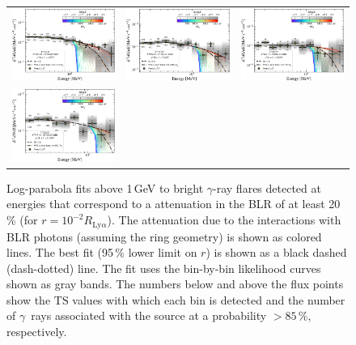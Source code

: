 \documentclass[twocolumn,linenumbers]{aastex62}
\newcommand{\Grays}{$\gamma$~rays\xspace}
\newcommand{\gray}{$\gamma$-ray\xspace}
\begin{document}
\begin{figure}
\begin{tabular}{ccc}
    \includegraphics[width=0.32\linewidth]{figures/sed_CTA102_t002_LogParabola_3min_ring_emin1000.pdf} & 
    \includegraphics[width=0.32\linewidth]{figures/sed_CTA102_t003_LogParabola_3min_ring_emin1000.pdf} & 
    \includegraphics[width=0.32\linewidth]{figures/sed_CTA102_t004_LogParabola_3min_ring_emin1000.pdf}\\
    \includegraphics[width=0.32\linewidth]{figures/sed_CTA102_t001_LogParabola_3min_ring_emin1000.pdf}
    \end{tabular}

    \caption{Log-parabola fits above 1\,GeV to bright \gray flares detected at energies that correspond to a attenuation in the BLR of at least 20\,\% (for $r = 10^{-2}R_{\mathrm{Ly}\alpha}$). The attenuation due to the interactions with BLR photons (assuming the ring geometry) is shown as colored lines. The best fit (95\,\% lower limit on $r$) is shown as a black dashed (dash-dotted) line. 
    The fit uses the bin-by-bin likelihood curves shown as gray bands. The numbers below and above the flux points show the $\mathrm{TS}$ values  with which each bin is detected and the number of \Grays associated with the source at a probability $>85\,\%$, respectively.}
    \label{fig:seds}
\end{figure}
\end{document}
